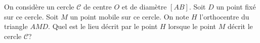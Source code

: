 
On considère un cercle $\mathscr{C}$ de centre $O$ et de diamètre $[AB]$. Soit $D$ un point fixé sur ce cercle. Soit $M$ un point mobile sur ce cercle. On note $H$ l'orthocentre du triangle $AMD$. Quel est le lieu décrit par le point $H$ lorsque le point $M$ décrit le cercle $\mathscr{C}$? 

